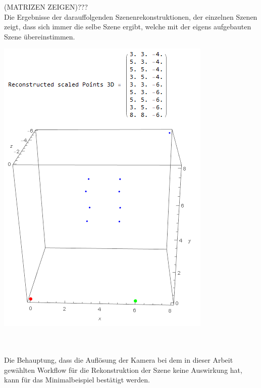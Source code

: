 (MATRIZEN ZEIGEN)???\\

Die Ergebnisse der darauffolgenden Szenenrekonstruktionen, der einzelnen Szenen zeigt, dass sich immer die selbe Szene ergibt, welche mit der eigens aufgebauten Szene übereinstimmen.\\


\begin{minipage}{\linewidth}
	\centering
	\includegraphics[width=0.5\linewidth]{images/DifferentAufloesungRekonstructedScene.png}
\end{minipage}\\ \\

Die Behauptung, dass die Auflösung der Kamera bei dem in dieser Arbeit gewählten Workflow für die Rekonstruktion der Szene keine Auswirkung hat, kann für das Minimalbeispiel bestätigt werden. 








